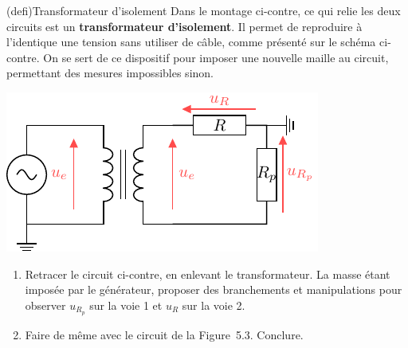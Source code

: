 \documentclass[../main/main.tex]{subfiles}
\begin{document}
\begin{tcb}[sidebyside, righthand ratio=.5](defi){Transformateur d'isolement}
	Dans le montage ci-contre, ce qui relie les deux circuits est un
	\textbf{transformateur d'isolement}. Il permet de reproduire à l'identique une
	tension sans utiliser de câble, comme présenté sur le schéma ci-contre.
	\smallbreak
	On se sert de ce dispositif pour imposer une nouvelle maille au circuit,
	permettant des mesures impossibles sinon.
	\tcblower
	\begin{center}
		\includegraphics[width=\linewidth]{carac_r_oscillo}
		\label{fig:transfo}
	\end{center}
\end{tcb}
\begin{enumerate}[label=\clenumi, start=5]
	\item Retracer le circuit ci-contre, en enlevant le transformateur. La masse
	      étant imposée par le générateur, proposer des branchements et
	      manipulations pour observer $u_{R_p}$ sur la voie 1 et $u_R$ sur la
	      voie 2.
	\item Faire de même avec le circuit de la Figure~5.3. Conclure.
\end{enumerate}
\end{document}
